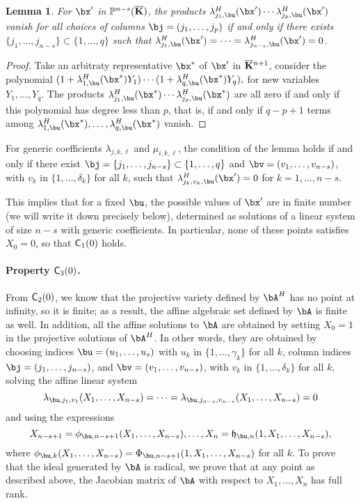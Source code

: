 \documentclass[12pt]{article}
\newtheorem{lemma}[definition]{Lemma}
\begin{document}
\begin{lemma}
  For $\bx'$ in $\mathbb{P}^{n-s}(\overline{\mathbf{K}})$, the products
  $\lambda^H_{j_1,\bu}(\bx')\cdots \lambda^H_{j_p,\bu}(\bx')$
  vanish for all choices of columns $\bj=(j_1,\dots,j_p)$ if and only
  if there exists $\{j_1,\dots,j_{n-s}\} \subset \{1,\dots,q\}$ such 
  that $\lambda^H_{j_1,\bu}(\bx')=\cdots=\lambda^H_{j_{n-s},\bu}(\bx')=0$.
\end{lemma}
\begin{proof}
  Take an arbitraty representative $\bx^*$ of $\bx'$ in
  $\overline{\mathbf{K}}{}^{n+1}$, consider the polynomial
  $(1+\lambda^H_{1,\bu}(\bx^*)Y_1) \cdots (1+\lambda^H_{q,\bu}(\bx^*)Y_q),$
  for new variables $Y_1,\dots,Y_q$. The products
  $\lambda^H_{j_1,\bu}(\bx^*)\cdots \lambda^H_{j_p,\bu}(\bx^*)$ are all zero
  if and only if this polynomial has degree less than $p$, that is, if
  and only if $q-p+1$ terms among
  $\lambda^H_{1,\bu}(\bx^*),\dots,\lambda^H_{q,\bu}(\bx^*)$ vanish.
\end{proof}


For generic coefficients $\lambda_{j,k,\ell}$ and $\mu_{i,k,\ell}$,
the condition of the lemma holds if and only if there exist
$\bj=\{j_1,\dots,j_{n-s}\} \subset \{1,\dots,q\}$ and
$\bv=(v_1,\dots,v_{n-s})$, with $v_k$ in $\{1,\dots,\delta_k\}$ for all
$k$, such that $\lambda^H_{j_k,v_k,\bu}(\bx')=0$ 
for $k=1,\dots,n-s$.

This implies that for a fixed $\bu$, the possible values of $\bx'$ are
in finite number (we will write it down precisely below), determined
as solutions of a linear system of size $n-s$ with generic
coefficients. In particular, none of these points satisfies $X_0=0$,
so that $\mathsf{C}_1(0)$ holds.

\paragraph{Property $\mathsf{C}_3(0)$.} From $\mathsf{C}_2(0)$, we know that
the projective variety defined by $\bA^\mH$ has no point at infinity,
so it is finite; as a result, the affine algebraic set defined by
$\bA$ is finite as well. In addition, all the affine solutions to
$\bA$ are obtained by setting $X_0=1$ in the projective solutions of
$\bA^\mH$. In other words, they are obtained by choosing indices
$\bu=(u_1,\dots,u_s)$ with $u_k$ in $\{1,\dots,\gamma_k\}$ for all $k$,
column indices $\bj=(j_1,\dots,j_{n-s})$, and
$\bv=(v_1,\dots,v_{n-s})$, with $v_k$ in $\{1,\dots,\delta_k\}$
for all $k$, solving the affine linear system
$$\lambda_{\bu,j_1,v_1}(X_1,\dots,X_{n-s})=\cdots=\lambda_{\bu,j_{n-s},v_{n-s}}(X_1,\dots,X_{n-s})=0$$ 
and using the expressions
$$X_{n-s+1}=\phi_{\bu,n-s+1}(X_1,\dots,X_{n-s}),\dots,X_{n}=\mathfrak{h}_{\bu,n}(1,X_1,\dots,X_{n-s}),$$
where $\phi_{\bu,k}(X_1,\dots,X_{n-s})=\Phi_{\bu,n-s+1}(1,X_1,\dots,X_{n-s})$
for all $k$.
To prove that the ideal generated by $\bA$ is radical, we prove that
at any point as described above, the Jacobian matrix of $\bA$ with
respect to $X_1,\dots,X_n$ has full rank.
\end{document}
